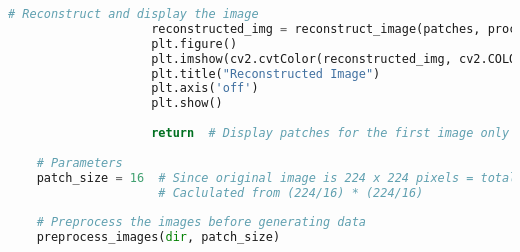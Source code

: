 \begin{lstlisting}[language=Python]
                    # Reconstruct and display the image
                    reconstructed_img = reconstruct_image(patches, processed_img.shape, patch_size)
                    plt.figure()
                    plt.imshow(cv2.cvtColor(reconstructed_img, cv2.COLOR_BGR2RGB))
                    plt.title("Reconstructed Image")
                    plt.axis('off')
                    plt.show()
    
                    return  # Display patches for the first image only
    
    # Parameters
    patch_size = 16  # Since original image is 224 x 224 pixels = total 196 patches
                     # Caclulated from (224/16) * (224/16)
    
    # Preprocess the images before generating data
    preprocess_images(dir, patch_size)
\end{lstlisting}


